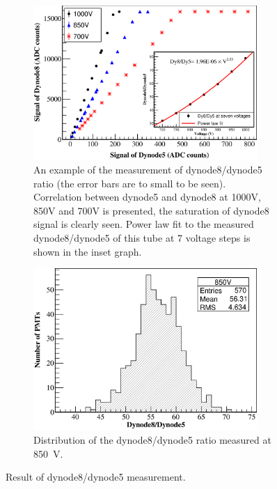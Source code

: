 \documentclass{nst}
\begin{document}
\begin{figure}[!tb]
	
	\begin{subfigure}[t]{85mm}
		\includegraphics[width=85mm]{FIG8_a}
		\caption{An example of the measurement of dynode8/dynode5 ratio (the error bars are to small to be seen). Correlation between dynode5 and dynode8 at 1000V, 850V and 700V is presented, the saturation of dynode8 signal is clearly seen. Power law fit to the measured dynode8/dynode5 of this tube at 7 voltage steps is shown in the inset graph.}
		\label{fig:FIG8_a}
	\end{subfigure}
	\begin{subfigure}[t]{85mm}
		\includegraphics[width=85mm]{FIG8_b}
		\caption{Distribution of the dynode8/dynode5 ratio measured at \SI{850}{\volt}.}
		\label{fig:FIG8_b}
	\end{subfigure}
	
	\caption{Result of dynode8/dynode5 measurement.}
	\label{fig:FIG8}
\end{figure}
\end{document}
